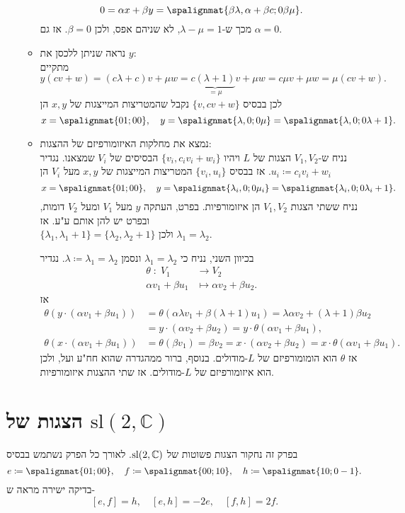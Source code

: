 \documentclass{report}
\theoremstyle{break}
\theoremstyle{MyNonumberbreak}
\begin{document}
\begin{itemize}
\begin{itemize}
		\[ 0 = \alpha x + \beta y = \spalignmat{\beta\lambda, \alpha+\beta c ; 0 \beta\mu}. \]
		מכך ש-$\lambda - \mu = 1$, לא שניהם אפס, ולכן $\beta = 0$. אז גם $\alpha = 0$.
		\item
		נראה שניתן ללכסן את $y$: \\
		מתקיים
		\[ y(cv + w) = (c\lambda + c)v + \mu w = c\underbrace{(\lambda + 1)}_{=\mu}v + \mu w = c\mu v + \mu w = \mu(cv + w). \]
		לכן בבסיס $\{v, cv + w\}$ נקבל שהמטריצות המייצגות של $x, y$ הן
		\[ x = \spalignmat{0 1 ; 0 0}, \quad y  = \spalignmat{\lambda, 0 ; 0 \mu} = \spalignmat{\lambda, 0 ; 0 \lambda+1}. \]
		\item
		נמצא את מחלקות האיזומורפיזם של ההצגות: \\
		נניח ש-$V_1, V_2$ הצגות של $L$ ויהיו $\{v_i, c_iv_i + w_i\}$ הבסיסים של $V_i$ שמצאנו. נגדיר $u_i \coloneqq c_iv_i + w_i$. אז בבסיס $\{v_i, u_i\}$ המטריצות המייצגות של $x, y$ מעל $V_i$ הן
		\[ x = \spalignmat{0 1 ; 0 0}, \quad y  = \spalignmat{\lambda_i, 0 ; 0 \mu_i} = \spalignmat{\lambda_i, 0 ; 0 \lambda_i+1}. \]
		נניח ששתי הצגות $V_1, V_2$ הן איזומורפיות. בפרט, העתקה $y$ מעל $V_1$ ומעל $V_2$ דומות, ובפרט יש להן אותם ע"ע. אז \\$\{\lambda_1, \lambda_1+1\} = \{\lambda_2,\lambda_2+1\}$ ולכן $\lambda_1=\lambda_2$.
		
		בכיוון השני, נניח כי $\lambda_1 = \lambda_2$ ונסמן $\lambda \coloneqq \lambda_1 = \lambda_2$. נגדיר
		\begin{align*}
			\theta \; : \; V_1 &\longrightarrow V_2 \\
			\alpha v_1 + \beta u_1 &\longmapsto \alpha v_2 + \beta u_2.
		\end{align*}
		אז
		\begin{align*}
			\theta(y \cdot (\alpha v_1 + \beta u_1)) &= \theta(\alpha\lambda v_1 + \beta(\lambda+1) u_1) = \lambda\alpha v_2 + (\lambda+1)\beta u_2 \\
				&= y \cdot (\alpha v_2 + \beta u_2) = y \cdot \theta(\alpha v_1 + \beta u_1), \\
			\theta(x \cdot (\alpha v_1 + \beta u_1)) &= \theta(\beta v_1) = \beta v_2 = x \cdot (\alpha v_2 + \beta u_2) = x \cdot \theta(\alpha v_1 + \beta u_1).
		\end{align*}
		אז $\theta$ הוא הומומורפיזם של $L$-מודולים. בנוסף, ברור ממהגדרה שהוא חח"ע ועל, ולכן הוא איזומורפיזם של $L$-מודולים. אז שתי ההצגות איזומורפיות.
	\end{itemize}
\end{itemize}


\chapter{הצגות של $\mathrm{sl}(2, \mathbb{C})$}
בפרק זה נחקור הצגות פשוטות של $\operatorname{sl}(2, \operatorname{\mathbb{C}})$. לאורך כל הפרק נשתמש בבסיס
\[ e \coloneqq \spalignmat{0 1 ; 0 0}, \quad f \coloneqq \spalignmat{0 0 ; 1 0}, \quad h \coloneqq \spalignmat{1 0 ; 0 -1}. \]
בדיקה ישירה מראה ש-
\[ [e, f] = h, \quad [e, h] = -2e, \quad [f, h]  = 2f. \]
\end{document}
